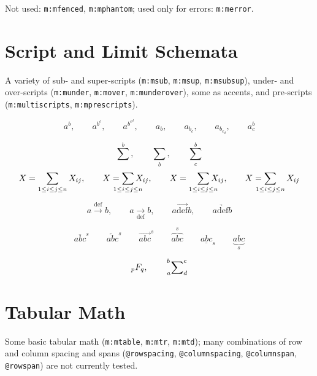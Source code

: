 \documentclass{article}
\makeatletter
\newcommand{\mml}[1]{\texttt{m:#1}}
\newcommand{\attr}[1]{\texttt{@#1}}
\makeatother
\begin{document}
Not used: \mml{mfenced}, \mml{mphantom};
used only for errors: \mml{merror}.

\section{Script and Limit Schemata}
A variety of sub- and super-scripts (\mml{msub}, \mml{msup}, \mml{msubsup}),
under- and over-scripts (\mml{munder}, \mml{mover}, \mml{munderover}),
some as accents, and pre-scripts (\mml{multiscripts}, \mml{mprescripts}).

\begin{equation}
 a^{b},\qquad
 a^{b^{c}},\qquad
 a^{b^{c^{d}}},\qquad
 a_{b},\qquad
 a_{b_{c}},\qquad
 a_{b_{c_ {d}}},\qquad
 a^{b}_{c}
\end{equation}

\begin{equation}
 \sum^{b},\qquad
 \sum_{b},\qquad
 \sum^{b}_{c}
\end{equation}
\begin{equation}
X = \sum_{1\le i \le j \le n} X_{ij},\qquad
X = \sum_{\mathclap{1\le i \le j \le n}} X_{ij},\qquad
X = \smashoperator[r]{\sum_{1\le i \le j \le n}} X_{ij},\qquad
X = \smashoperator[l]{\sum_{1\le i \le j \le n}} X_{ij}
\end{equation}

\begin{equation}
 a \overset{\mathrm{def}}{\rightarrow} b, \qquad
 a \underset{\mathrm{def}}{\rightarrow} b,\qquad
 a \overrightarrow{\mathrm{def}} b,\qquad
 a \underrightarrow{\mathrm{def}} b
\end{equation}

\begin{equation}
  \overline{abc}^s \qquad
  \overleftarrow{abc}^s \qquad
  \overrightarrow{abc}^s \qquad
  \overbrace{abc}^s \qquad
  \underline{abc}_s \qquad
  \underbrace{abc}_s
\end{equation}

\begin{equation}
 {}_p F_q,\qquad
 \sideset{_a^b}{^c_d}{\sum}
\end{equation}

\section{Tabular Math}
Some basic tabular math (\mml{mtable}, \mml{mtr}, \mml{mtd});
many combinations of row and column spacing and spans
(\attr{rowspacing}, \attr{columnspacing}, \attr{columnspan}, \attr{rowspan})
are not currently tested.
\end{document}

